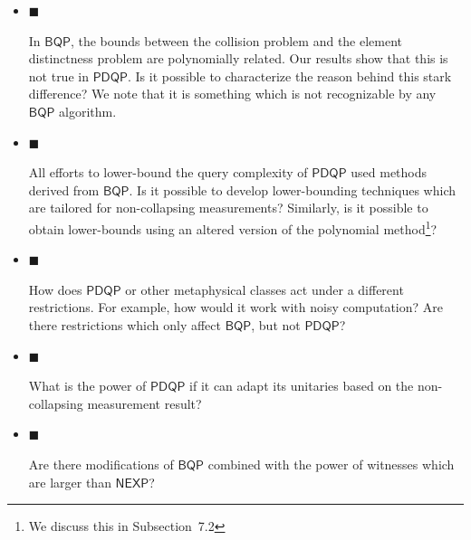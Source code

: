 \begin{itemize}


\item[] 
$\blacksquare$ 


In $\mathsf{BQP}$, the bounds between the collision problem and the element distinctness problem are polynomially related. Our results show that this is not true in $\mathsf{PDQP}$. Is it possible to characterize the reason behind this stark difference? We note that it is something which is not recognizable by any $\mathsf{BQP}$ algorithm.\par





\item[] 
$\blacksquare$ 


All efforts to lower-bound the query complexity of $\mathsf{PDQP}$ used methods derived from $\mathsf{BQP}$. Is it possible to develop lower-bounding techniques which are tailored for non-collapsing measurements? Similarly, is it possible to obtain lower-bounds using an altered version of the polynomial method\footnote{We discuss this in Subsection 7.2}?\par





\item[] 
$\blacksquare$ 


How does $\mathsf{PDQP}$ or other metaphysical classes act under a different restrictions. For example, how would it work with noisy computation? Are there restrictions which only affect $\mathsf{BQP}$, but not $\mathsf{PDQP}$?\par





\item[] 
$\blacksquare$ 


What is the power of $\mathsf{PDQP}$ if it can adapt its unitaries based on the non-collapsing measurement result?\par





\item[] 
$\blacksquare$ 


Are there modifications of $\mathsf{BQP}$ combined with the power of witnesses which are larger than $\mathsf{NEXP}$?\par






\end{itemize}
